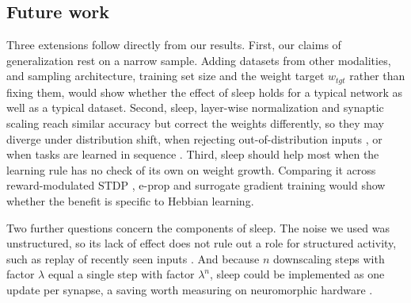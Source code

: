 
\subsection{Future work}
Three extensions follow directly from our results. First, our claims of
generalization rest on a narrow sample. Adding datasets from other modalities,
and sampling architecture, training set size and the weight target $w_{tgt}$
rather than fixing them, would show whether the effect of sleep holds for a
typical network as well as a typical dataset. Second, sleep, layer-wise
normalization and synaptic scaling reach similar accuracy but correct the weights
differently, so they may diverge under distribution shift, when rejecting
out-of-distribution inputs \citep{hendrycks_baseline_2017}, or when tasks are
learned in sequence \citep{tadros_sleep-like_2022}. Third, sleep should help most
when the learning rule has no check of its own on weight growth. Comparing it
across reward-modulated STDP \citep{fremaux_neuromodulated_2016}, e-prop
\citep{bellec_solution_2020} and surrogate gradient training
\citep{neftci_surrogate_2019} would show whether the benefit is specific to
Hebbian learning.

Two further questions concern the components of sleep. The noise we used was
unstructured, so its lack of effect does not rule out a role for structured
activity, such as replay of recently seen inputs \citep{deperrois_learning_2022}.
And because $n$ downscaling steps with factor $\lambda$ equal a single step with
factor $\lambda^{n}$, sleep could be implemented as one update per synapse, a
saving worth measuring on neuromorphic hardware \citep{davies_loihi_2018}.

